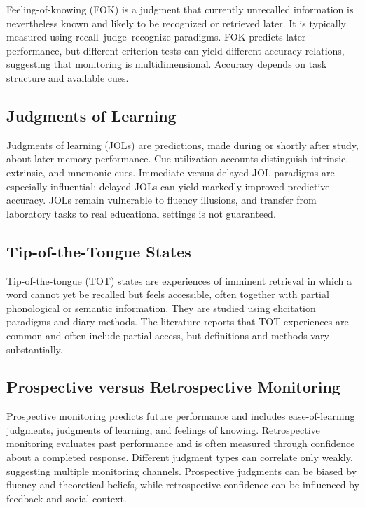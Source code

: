\documentclass[a4paper]{article}
\begin{document}
   Feeling-of-knowing (FOK) is a judgment that currently unrecalled information is nevertheless known and likely to be recognized or retrieved later. It is typically measured using recall--judge--recognize paradigms. FOK predicts later performance, but different criterion tests can yield different accuracy relations, suggesting that monitoring is multidimensional. Accuracy depends on task structure and available cues.

   \subsection{Judgments of Learning}

   Judgments of learning (JOLs) are predictions, made during or shortly after study, about later memory performance. Cue-utilization accounts distinguish intrinsic, extrinsic, and mnemonic cues. Immediate versus delayed JOL paradigms are especially influential; delayed JOLs can yield markedly improved predictive accuracy. JOLs remain vulnerable to fluency illusions, and transfer from laboratory tasks to real educational settings is not guaranteed.

   \subsection{Tip-of-the-Tongue States}

   Tip-of-the-tongue (TOT) states are experiences of imminent retrieval in which a word cannot yet be recalled but feels accessible, often together with partial phonological or semantic information. They are studied using elicitation paradigms and diary methods. The literature reports that TOT experiences are common and often include partial access, but definitions and methods vary substantially.

   \subsection{Prospective versus Retrospective Monitoring}

   Prospective monitoring predicts future performance and includes ease-of-learning judgments, judgments of learning, and feelings of knowing. Retrospective monitoring evaluates past performance and is often measured through confidence about a completed response. Different judgment types can correlate only weakly, suggesting multiple monitoring channels. Prospective judgments can be biased by fluency and theoretical beliefs, while retrospective confidence can be influenced by feedback and social context.
\end{document}
